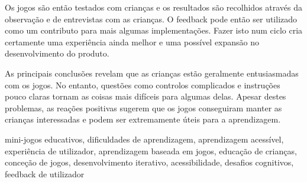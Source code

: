 Os jogos são então testados com crianças e os resultados são recolhidos através da observação e de entrevistas com as crianças. O feedback pode então ser utilizado como um contributo para mais algumas implementações. Fazer isto num ciclo cria certamente uma experiência ainda melhor e uma possível expansão no desenvolvimento do produto.

As principais conclusões revelam que as crianças estão geralmente entusiasmadas com os jogos. No entanto, questões como controlos complicados e instruções pouco claras tornam as coisas mais difíceis para algumas delas. Apesar destes problemas, as reações positivas sugerem que os jogos conseguiram manter as crianças interessadas e podem ser extremamente úteis para a aprendizagem.

\begin{keywords}
	mini-jogos educativos, dificuldades de aprendizagem, aprendizagem acessível, experiência de utilizador, aprendizagem baseada em jogos, educação de crianças, conceção de jogos, desenvolvimento iterativo, acessibilidade, desafios cognitivos, feedback de utilizador
\end{keywords}
